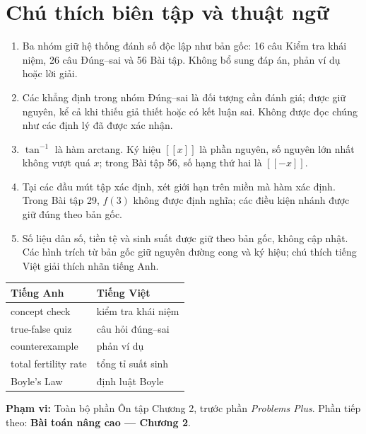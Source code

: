 \documentclass[12pt,a4paper]{article}
\newcommand{\gint}[1]{\left[\!\left[#1\right]\!\right]}
\begin{document}
\section*{Chú thích biên tập và thuật ngữ}
\begin{enumerate}
\item Ba nhóm giữ hệ thống đánh số độc lập như bản gốc: 16 câu Kiểm tra khái niệm, 26 câu Đúng–sai và 56 Bài tập. Không bổ sung đáp án, phản ví dụ hoặc lời giải.
\item Các khẳng định trong nhóm Đúng–sai là đối tượng cần đánh giá; được giữ nguyên, kể cả khi thiếu giả thiết hoặc có kết luận sai. Không được đọc chúng như các định lý đã được xác nhận.
\item $\tan^{-1}$ là hàm arctang. Ký hiệu $\gint{x}$ là phần nguyên, số nguyên lớn nhất không vượt quá $x$; trong Bài tập 56, số hạng thứ hai là $\gint{-x}$.
\item Tại các đầu mút tập xác định, xét giới hạn trên miền mà hàm xác định. Trong Bài tập 29, $f(3)$ không được định nghĩa; các điều kiện nhánh được giữ đúng theo bản gốc.
\item Số liệu dân số, tiền tệ và sinh suất được giữ theo bản gốc, không cập nhật. Các hình trích từ bản gốc giữ nguyên đường cong và ký hiệu; chú thích tiếng Việt giải thích nhãn tiếng Anh.
\end{enumerate}
\begin{center}\begin{tabular}{ll}\toprule Tiếng Anh&Tiếng Việt\\\midrule
concept check&kiểm tra khái niệm\\
true-false quiz&câu hỏi đúng–sai\\
counterexample&phản ví dụ\\
total fertility rate&tổng tỉ suất sinh\\
Boyle's Law&định luật Boyle\\\bottomrule
\end{tabular}\end{center}
\noindent\textbf{Phạm vi:} Toàn bộ phần Ôn tập Chương 2, trước phần \textit{Problems Plus}. Phần tiếp theo: \textbf{Bài toán nâng cao — Chương 2}.
\end{document}
